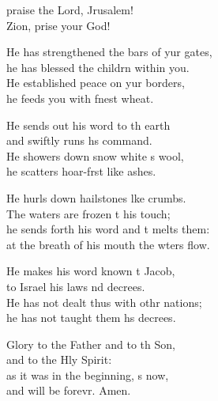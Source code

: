 \settowidth{\versewidth}{He has strengthened the bars of your gates, *}
\begin{psalmverse}%
  \begin{patverse}
     praise the Lord, Jrusalem!\Med\\
    Zion, prise your God!
    
    He has strengthened the bars of yur gates,\Med\\
    he has blessed the childrn within you.\\
    He established peace on yur borders,\Med\\
    he feeds you with f\pointup{\i}nest wheat.
    
    He sends out his word to th earth\Med\\
    and swiftly runs h\pointup{\i}s command.\\
    He showers down snow white s wool,\Med\\
    he scatters hoar-frst like ashes.
    
    He hurls down hailstones l\pointup{\i}ke crumbs.\Med\\
    The waters are frozen t his touch;\\
    he sends forth his word and \pointup{\i}t melts them:\Med\\
    at the breath of his mouth the wters flow.
    
    He makes his word known t Jacob,\Med\\
    to Israel his laws nd decrees.\\
    He has not dealt thus with othr nations;\Med\\
    he has not taught them h\pointup{\i}s decrees.
    
    Glory to the Father and to th Son,\Med\\
    and to the Hly Spirit:\\
    as it was in the beginning, \pointup{\i}s now,\Med\\
    and will be forevr. Amen.
  \end{patverse}
\end{psalmverse}
